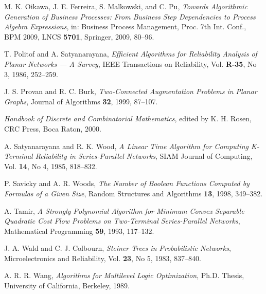 \documentclass[11pt]{article}\usepackage{amsmath}
\begin{document}
\begin{thebibliography}{99}
M. K. Oikawa, J. E. Ferreira, S. Malkowski, and C. Pu,
\emph{Towards Algorithmic Generation of Business Processes: From Business Step
Dependencies to Process Algebra Expressions}, in: Business Process Management,
Proc. 7th Int. Conf., BPM 2009, LNCS \textbf{5701}, Springer, 2009, 80--96.

T. Politof and A. Satyanarayana, \emph{Efficient Algorithms for
Reliability Analysis of Planar Networks --- A Survey}, IEEE Transactions on
Reliability, Vol. \textbf{R-35}, No 3, 1986, 252--259.

J. S. Provan and R. C. Burk, \emph{Two-Connected Augmentation
Problems in Planar Graphs}, Journal of Algorithms \textbf{32}, 1999, 87--107.

\emph{Handbook of Discrete and Combinatorial Mathematics},
edited by K. H. Rosen, CRC Press, Boca Raton, 2000.

A. Satyanarayana and R. K. Wood, \emph{A Linear Time Algorithm
for Computing K-Terminal Reliability in Series-Parallel Networks}, SIAM
Journal of Computing, Vol. \textbf{14}, No 4, 1985, 818--832.

P. Savicky and A. R. Woods, \emph{The Number of Boolean
Functions Computed by Formulas of a Given Size}, Random Structures and
Algorithms \textbf{13}, 1998, 349--382.

A. Tamir, \emph{A Strongly Polynomial Algorithm for Minimum
Convex Separable Quadratic Cost Flow Problems on Two-Terminal Series-Parallel
Networks}, Mathematical Programming \textbf{59}, 1993, 117--132.

J. A. Wald and C. J. Colbourn, \emph{Steiner Trees in
Probabilistic Networks}, Microelectronics and Reliability, Vol. \textbf{23},
No 5, 1983, 837--840.

A. R. R. Wang, \emph{Algorithms for Multilevel Logic
Optimization}, Ph.D. Thesis, University of California, Berkeley, 1989.
\end{thebibliography}
\end{document}
